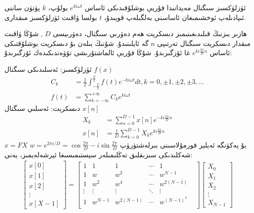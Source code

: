 ئۈزلۈكسىز سىگنال مەيدانىدا فۇريې بوشلۇقىدىكى ئاساس $e^{ki \omega t}$ بولۇپ، $k$ پۈتۈن ساننى ئىپادىلەپ ئوخشىمىغان ئاساسنى بەلگىلەپ قويىدۇ، $t$ بولسا ۋاقىت ئۈزلۈكسىز مىقدارى.

ھازىر بىزنىڭ قىلىدىغىنىمىز دىسكرېت ھەم دەۋرىي سىگنال، دەۋرىيسى $D$ , شۇڭا ۋاقىت مىقدار دىسكرېت سىگنال تەرتىپى $n$ گە ئايلىنىدۇ. شۇنىڭ بىلەن بۇ دىسكرېت بوشلۇقتىكى ئاساس $e^{ki \frac{2 \pi}{D} n}$ غا ئۆزگىرىدۇ. شۇڭا فۇريې ئالماشتۇرىشى تۆۋەندىكىدەك ئۆزگىرىدۇ:

ئۈزلۈكسىز: ئەسلىدىكى سىگنال $f(x)$ 
\begin{align*}
C_k &= \frac{1}{T} \int_{-\frac{T}{2}}^{\frac{T}{2}} f(t)e^{-ki \omega t}dt , k=0, \pm 1, \pm 2 , \pm 3, ... \\
f(t) &= \sum_{k=-\infty}^{+\infty}C_k e^{ki \omega t}
\end{align*}
دىسكرېت: ئەسلىي سىگنال $x[n]$ 
\begin{align*}
X_k &= \sum_{n=0}^{D-1}x[n] e^{-ki \frac{2 \pi}{D} n}
\\
x[n] &= \frac{1}{D}\sum_{k=0}^{D-1}X_k e^{ki \frac{2 \pi}{D} n}
\end{align*}
بۇ يەكۈنگە ئەيلېر فورمۇلاسىنى بىرلەشتۈرۈپ 
$w = e^{2 \pi i/D} = \cos \frac{2 \pi}{D} -i \sin \frac{2 \pi}{D}$ 
$x=FX$
 شەكلىدىكى سىزىقلىق تەڭلىمىلەر سېستىمىسىغا ئېرشەلەيمىز، يەنى:
\begin{align*}
 \begin{bmatrix}
	x[0] \\
	x[1] \\
	x[2] \\
	\vdots \\
	x[X-1]
\end{bmatrix} 
=
\begin{bmatrix}
	1& 1& 1& \cdots & 1 \\
	1& w& w^2& \cdots & w^{N-1} \\
	1& w^2& w^4& \cdots & w^{2(N-1)} \\
	\vdots & \vdots & \vdots & \ddots & \vdots &\\
	1& w^{N-1}& w^{2(N-1)}& \cdots & w^{(N-1)^2} \\
\end{bmatrix}
\begin{bmatrix}
	X_0 \\
	X_1 \\
	X_2 \\
	\vdots \\
	X_{N-1}
\end{bmatrix}
\end{align*}

